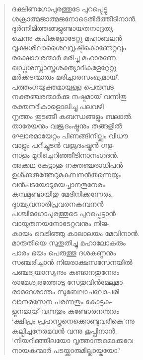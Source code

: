 \begin{verse}
ദക്ഷിണഗോപുരത്തൂടേ പുറപ്പെട്ടു\\
ശക്രാത്മജാത്മജനോടെതിര്‍ത്തീടിനാന്‍.\\
ദുര്‍ന്നിമിത്തങ്ങളുണ്ടായതനാദൃത്യ\\
ചെന്നു കപികളോടേറ്റു മഹാബലന്‍\\
വൃക്ഷശിലാശൈലവൃഷ്ടികൊണ്ടേറ്റവും\\
രക്ഷോവരന്മാര്‍ മരിച്ചു മഹാരണേ.\\
ഖഡ്ഗശസ്ത്രാസ്ത്രശക്ത്യാദികളേറ്റേറ്റു\\
മര്‍ക്കടന്മാരും മരിച്ചാരസംഖ്യമായ്.\\
പത്തംഗയുക്തമായുള്ള പെരുമ്പട\\
നക്തഞ്ചരന്മാര്‍ക്കു നഷ്ടമായ് വന്നിതു\\
രക്തനദികാളൊലിച്ചു പലവഴി\\
നൃത്തം തുടങ്ങീ കബന്ധങ്ങളും ബലാല്‍.\\
താരേയനും വജ്രദംഷ്ട്രനും തങ്ങളില്‍\\
ഘോരമായേറ്റം പിണങ്ങിനില്ക്കും വിധൗ\\
വാളും പറിച്ചുടന്‍ വജ്രദംഷ്ട്രന്‍ ഗള-\\
നാളം മുറിച്ചെറിഞ്ഞീടിനാനംഗദന്‍.\\
അക്കഥ കേട്ടാശു നക്തഞ്ചരാധിപന്‍\\
ഉള്‍ക്കരുത്തേറുമകമ്പനന്‍തന്നെയും\\
വന്‍പടയോടുമയച്ചാനതുനേരം\\
കമ്പമുണ്ടായിതു മേദിനിക്കന്നേരം.\\
ദുശ്ച്യവനാരിപ്രവരനകമ്പനന്‍\\
പശ്ചിമഗോപുരത്തൂടെ പുറപ്പെട്ടാന്‍\\
വായുതനയനോടേറ്റവനും നിജ-\\
കായം വെടിഞ്ഞു കാലാലയം മേവിനാന്‍.\\
മാരുതിയെ സുതുതിച്ചു മഹാലോകരും\\
പാരം ഭയം പെരുത്തൂ ദശകണ്ഠനും\\
സഞ്ചരിച്ചാന്‍ നിജരാക്ഷസസേനയില്‍\\
പഞ്ചദ്വയാസ്യനും കണ്ടാനതുനേരം\\
രാമേശ്വരത്തോടു സേതുവിന്‍മേലുമാ-\\
രാമദേശാന്തം സുബേലാചലോപരി\\
വാനരസേന പരന്നതും കോട്ടക-\\
ളൂനമായ് വന്നതും കണ്ടോരനന്തരം\\
‘ക്ഷിപ്രം പ്രഹസ്തനെക്കൊണ്ടുവരികെ’ന്നു\\
കല്പിച്ചനേരമവന്‍ വന്നു കൂപ്പിനാന്‍.\\
‘നീയറിഞ്ഞീലയോ വൃത്താന്തമൊക്കവേ\\
നായകന്മാര്‍ പടയ്ക്കാരുമില്ലായ്കയോ?\\

\end{verse}
